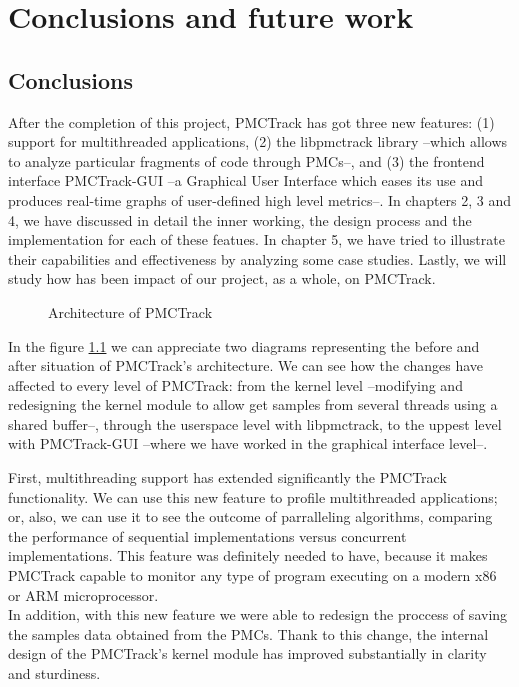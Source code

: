 \chapter{Conclusions and future work}


\section{Conclusions}

After the completion of this project, PMCTrack has got three new features: (1) support for multithreaded applications, (2) the libpmctrack library --which allows to analyze particular fragments of code through PMCs--, and (3) the frontend interface PMCTrack-GUI --a Graphical User Interface which eases its use and produces real-time graphs of user-defined high level metrics--. In chapters 2, 3 and 4, we have discussed in detail the inner working, the design process and the implementation for each of these featues. In chapter 5, we have tried to illustrate their capabilities and effectiveness by analyzing some case studies. Lastly, we will study how has been impact of our project, as a whole, on PMCTrack.

\begin{figure}%
    \centering
    \qquad
\caption{Architecture of PMCTrack}%
\label{fig:beforeandafter}%
\end{figure}

In the figure \ref{fig:beforeandafter} we can appreciate two diagrams representing the before and after situation of PMCTrack's architecture. We can see how the changes have affected to every level of PMCTrack: from the kernel level --modifying and redesigning the kernel module to allow get samples from several threads using a shared buffer--, through the userspace level with libpmctrack, to the uppest level with PMCTrack-GUI --where we have worked in the graphical interface level--.

First, multithreading support has extended significantly the PMCTrack functionality. We can use this new feature to profile multithreaded applications; or, also, we can use it to see the outcome of parralleling algorithms, comparing the performance of sequential implementations versus concurrent implementations. This feature was definitely needed to have, because it makes PMCTrack capable to monitor any type of program executing on a modern x86 or ARM microprocessor.\\%
In addition, with this new feature we were able to redesign the proccess of saving the samples data obtained from the PMCs. Thank to this change, the internal design of the PMCTrack's kernel module has improved substantially in clarity and sturdiness.

